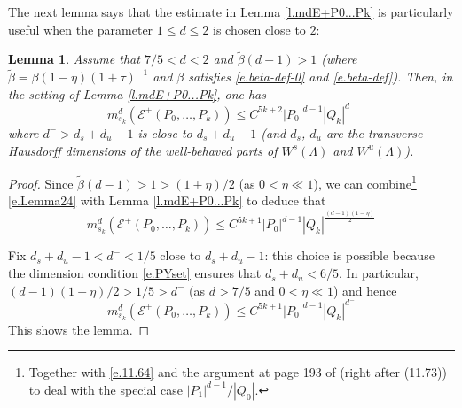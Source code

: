 \documentclass[12pt]{amsart}
\newtheorem{lemma}[theorem]{Lemma}
\numberwithin{equation}{section}
\theoremstyle{definition}
\newcommand{\<}{{\langle}}
\renewcommand{\>}{{\rangle}}
\begin{document}

The next lemma says that the estimate in Lemma \ref{l.mdE+P0...Pk} is particularly useful when the parameter $1\leq d\leq 2$ is chosen close to $2$:

\begin{lemma}\label{l.mdE+P0...Pk2} Assume that $7/5<d<2$ and $\widetilde{\beta}(d-1)>1$ (where $\widetilde{\beta}=\beta(1-\eta)(1+\tau)^{-1}$ and $\beta$ satisfies \eqref{e.beta-def-0} and \eqref{e.beta-def}). Then, in the setting of Lemma \ref{l.mdE+P0...Pk}, one has 
$$m^d_{s_k}(\mathcal{E}^+(P_0,\dots,P_k))\leq C^{5k+2}|P_0|^{d-1}|Q_k|^{d^-}$$ 
where $d^->d_s+d_u-1$ is close to $d_s+d_u-1$ (and $d_s$, $d_u$ are the transverse Hausdorff dimensions of the well-behaved parts of $W^s(\Lambda)$ 
and $W^u(\Lambda)$).
\end{lemma}

\begin{proof} Since $\widetilde{\beta}(d-1)>1>(1+\eta)/2$ (as $0<\eta\ll 1$), we can combine\footnote{Together with \eqref{e.11.64} and the argument at page 193 of \cite{PY09} (right after (11.73)) to deal with the special case $|P_1|^{d-1}/|Q_0|$.} \eqref{e.Lemma24} with Lemma \ref{l.mdE+P0...Pk} to deduce that 
$$m^d_{s_k}(\mathcal{E}^+(P_0,\dots,P_k))\leq C^{5k+1}|P_0|^{d-1}|Q_k|^{\frac{(d-1)(1-\eta)}{2}}$$

Fix $d_s+d_u-1<d^-<1/5$ close to $d_s+d_u-1$: this choice is possible because the dimension condition \eqref{e.PYset} ensures that $d_s+d_u<6/5$. In particular,  $(d-1)(1-\eta)/2>1/5>d^-$ (as $d>7/5$ and $0<\eta\ll1$) and hence 
$$m^d_{s_k}(\mathcal{E}^+(P_0,\dots,P_k))\leq C^{5k+1}|P_0|^{d-1}|Q_k|^{d^-}$$
This shows the lemma.
\end{proof}
\end{document}
